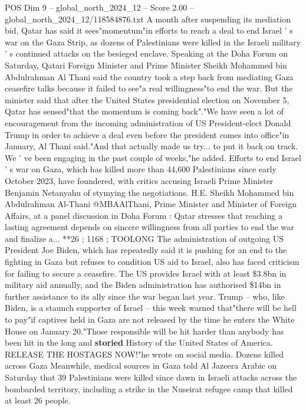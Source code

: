\begin{textsample}{POS Dim 9 – global\_north\_2024\_12 – Score 2.00 – global\_north\_2024\_12/118584876.txt}  \label{ex:f9_pos_332}
A month after suspending its mediation bid, Qatar has said it sees"momentum"in efforts to reach a deal to end Israel ' s war on the Gaza Strip, as dozens of Palestinians were killed in the Israeli military ' s continued attacks on the besieged enclave.
Speaking at the Doha Forum on Saturday, Qatari Foreign Minister and Prime Minister Sheikh Mohammed bin Abdulrahman Al Thani said the country took a step back from mediating Gaza ceasefire talks because it failed to see"a real willingness"to end the war.
But the minister said that after the United States presidential election on November 5, Qatar has sensed"that the momentum is coming back"."We have seen a lot of encouragement from the incoming administration of US President-elect Donald Trump in order to achieve a deal even before the president comes into office"in January, Al Thani said."And that actually made us try... to put it back on track.
We ' ve been engaging in the past couple of weeks,"he added.
Efforts to end Israel ' s war on Gaza, which has killed more than 44,600 Palestinians since early October 2023, have foundered, with critics accusing Israeli Prime Minister Benjamin Netanyahu of stymying the negotiations.
H.E.
Sheikh Mohammed bin Abdulrahman Al-Thani @MBAAlThani, Prime Minister and Minister of Foreign Affairs, at a panel discussion in Doha Forum : Qatar stresses that reaching a lasting agreement depends on sincere willingness from all parties to end the war and finalize a... **26 ; 1168 ; TOOLONG The administration of outgoing US President Joe Biden, which has repeatedly said it is pushing for an end to the fighting in Gaza but refuses to condition US aid to Israel, also has faced criticism for failing to secure a ceasefire.
The US provides Israel with at least \$3.8bn in military aid annually, and the Biden administration has authorised \$14bn in further assistance to its ally since the war began last year.
Trump -- who, like Biden, is a staunch supporter of Israel -- this week warned that"there will be hell to pay"if captives held in Gaza are not released by the time he enters the White House on January 20."Those responsible will be hit harder than anybody has been hit in the long and \textbf{storied} History of the United States of America.
RELEASE THE HOSTAGES NOW!"he wrote on social media.
Dozens killed across Gaza Meanwhile, medical sources in Gaza told Al Jazeera Arabic on Saturday that 39 Palestinians were killed since dawn in Israeli attacks across the bombarded territory, including a strike in the Nuseirat refugee camp that killed at least 26 people.

\end{textsample}
